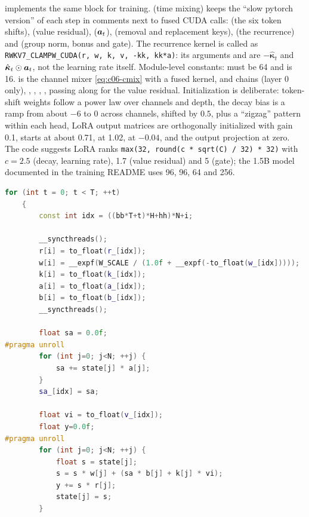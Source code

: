 \begin{implnote}[title={In the code: the official training model}]
 implements the same block for
training.  (time mixing) keeps the ``slow pytorch version'' of each step
in comments next to fused CUDA calls:  (the six token shifts),
 (value residual),  ($\bm{a}_t$),
 (removal and replacement keys),  (the
recurrence) and  (group norm, bonus and gate). The
recurrence kernel is called as \texttt{RWKV7\_CLAMPW\_CUDA(r, w, k, v, -kk, kk*a)}: its arguments
 and  are $-\hat{\bm\kappa}_t$ and $\hat{\bm\kappa}_t\odot\bm{a}_t$, not the
learning rate itself. Module-level constants:  must be 64 and
 is 16.  is the channel mixer \eqref{eq:c06-cmix} with
a fused kernel, and  chains  (layer 0 only), , ,
, , passing  along for the value residual.
Initialization is deliberate: token-shift weights follow a power law over channels and
depth, the decay bias  is a ramp from about $-6$ to $0$ across channels, shifted by
$0.5$, plus a ``zigzag'' pattern within each head, LoRA output matrices are orthogonally initialized with gain 0.1,
 starts at about 0.71,  at 1.02,  at $-0.04$, and the output
projection at zero. The code suggests LoRA ranks \texttt{max(32, round(c * sqrt(C) / 32) * 32)} with
$c=2.5$ (decay, learning rate), 1.7 (value residual) and 5 (gate); the 1.5B model documented in
the training README uses 96, 96, 64 and 256.
\end{implnote}

\begin{lstlisting}[language={C++},caption={Excerpt from \texttt{repos/\allowbreak{}BlinkDL\_\_RWKV-LM/\allowbreak{}RWKV-v7/\allowbreak{}train\_temp/\allowbreak{}cuda/\allowbreak{}rwkv7\_clampw.cu} (forward kernel, per-step loop)},label={lst:c06-rwkv-cuda}]
    for (int t = 0; t < T; ++t)
    {
        const int idx = ((bb*T+t)*H+hh)*N+i;

        __syncthreads();
        r[i] = to_float(r_[idx]);
        w[i] = __expf(W_SCALE / (1.0f + __expf(-to_float(w_[idx]))));
        k[i] = to_float(k_[idx]);
        a[i] = to_float(a_[idx]);
        b[i] = to_float(b_[idx]);
        __syncthreads();

        float sa = 0.0f;
#pragma unroll
        for (int j=0; j<N; ++j) {
            sa += state[j] * a[j];
        }
        sa_[idx] = sa;

        float vi = to_float(v_[idx]);
        float y=0.0f;
#pragma unroll
        for (int j=0; j<N; ++j) {
            float s = state[j];
            s = s * w[j] + (sa * b[j] + k[j] * vi);
            y += s * r[j];
            state[j] = s;
        }
\end{lstlisting}


